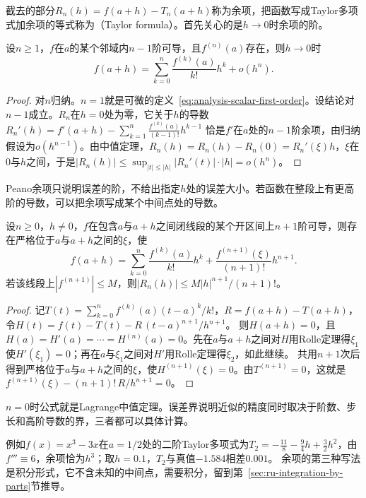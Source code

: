 截去的部分$R_n(h)=f(a+h)-T_n(a+h)$称为余项，把函数写成Taylor多项式加余项的等式称为（Taylor formula）。首先关心的是$h\to0$时余项的阶。
\begin{theorem}[带Peano余项的Taylor公式]
\label{thm:ru-taylor-peano}
设$n\geq1$，$f$在$a$的某个邻域内$n-1$阶可导，且$f^{(n)}(a)$存在，则$h\to0$时
\[
 f(a+h)=\sum_{k=0}^n\frac{f^{(k)}(a)}{k!}h^k+o(h^n).
\]
\end{theorem}
\begin{proof}
对$n$归纳。$n=1$就是可微的定义~\eqref{eq:analysis-scalar-first-order}。设结论对$n-1$成立。$R_n$在$h=0$处为零，它关于$h$的导数$R_n'(h)=f'(a+h)-\sum_{k=1}^n\frac{f^{(k)}(a)}{(k-1)!}h^{k-1}$
恰是$f'$在$a$处的$n-1$阶余项，由归纳假设为$o(h^{n-1})$。由中值定理，$R_n(h)=R_n(h)-R_n(0)=R_n'(\xi)h$，$\xi$在$0$与$h$之间，于是$|R_n(h)|\leq\sup_{|t|\leq|h|}|R_n'(t)|\cdot|h|=o(h^n)$。
\end{proof}
Peano余项只说明误差的阶，不给出指定$h$处的误差大小。若函数在整段上有更高阶的导数，可以把余项写成某个中间点处的导数。
\begin{theorem}[带Lagrange余项的Taylor公式]
\label{thm:analysis-taylor-lagrange}
设$n\geq0$，$h\neq0$，$f$在包含$a$与$a+h$之间闭线段的某个开区间上$n+1$阶可导，则存在严格位于$a$与$a+h$之间的$\xi$，使
\begin{equation}
 f(a+h)=\sum_{k=0}^n\frac{f^{(k)}(a)}{k!}h^k+\frac{f^{(n+1)}(\xi)}{(n+1)!}h^{n+1}.
 \label{eq:analysis-taylor-arbitrary-order}
\end{equation}
若该线段上$|f^{(n+1)}|\leq M$，则$|R_n(h)|\leq M|h|^{n+1}/(n+1)!$。
\end{theorem}
\begin{proof}
记$T(t)=\sum_{k=0}^nf^{(k)}(a)(t-a)^k/k!$，$R=f(a+h)-T(a+h)$，令$H(t)=f(t)-T(t)-R\,(t-a)^{n+1}/h^{n+1}$。
则$H(a+h)=0$，且$H(a)=H'(a)=\cdots=H^{(n)}(a)=0$。先在$a$与$a+h$之间对$H$用Rolle定理得$\xi_1$使$H'(\xi_1)=0$；再在$a$与$\xi_1$之间对$H'$用Rolle定理得$\xi_2$，如此继续。
共用$n+1$次后得到严格位于$a$与$a+h$之间的$\xi$，使$H^{(n+1)}(\xi)=0$。由$T^{(n+1)}=0$，这就是$f^{(n+1)}(\xi)-(n+1)!\,R/h^{n+1}=0$。
\end{proof}
$n=0$时公式就是Lagrange中值定理。误差界说明近似的精度同时取决于阶数、步长和高阶导数的界，三者都可以具体计算。

例如$f(x)=x^3-3x$在$a=1/2$处的二阶Taylor多项式为$T_2=-\tfrac{11}8-\tfrac94h+\tfrac32h^2$，由$f'''\equiv6$，余项恰为$h^3$；取$h=0.1$，$T_2$与真值$-1.584$相差$0.001$。
余项的第三种写法是积分形式，它不含未知的中间点，需要积分，留到第~\ref{sec:ru-integration-by-parts}节推导。

